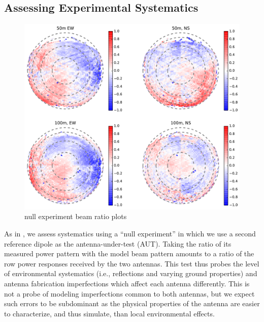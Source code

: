 \documentclass[preprint]{aastex}
\begin{document}

\subsection{Assessing Experimental Systematics}


\begin{figure}[h]
\centering
\includegraphics[width=6.5in]{null_expt_rel_beam_maps.pdf}
\caption{null experiment beam ratio plots}
\label{fig:nullexptplots}
\end{figure}

As in \citet{neben15}, we assess systematics using a ``null experiment'' in which we use a second reference dipole as the antenna-under-test (AUT). Taking the ratio of its measured power pattern with the model beam pattern amounts to a ratio of the row power responses received by the two antennas. This test thus probes the level of environmental systematics (i.e., reflections and varying ground properties) and antenna fabrication imperfections which affect each antenna differently. This is not a probe of modeling imperfections common to both antennas, but we expect such errors to be subdominant as the physical properties of the antenna are easier to characterize, and thus simulate, than local environmental effects. 
\end{document}
